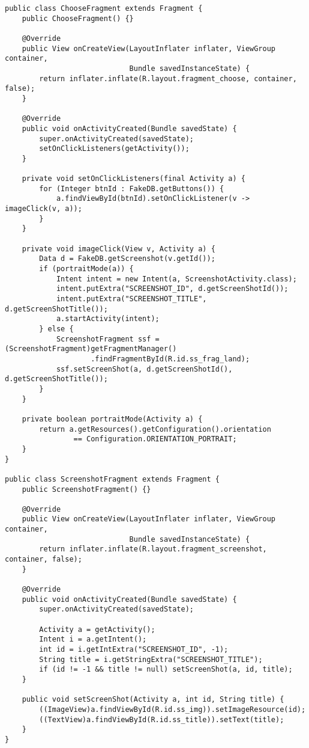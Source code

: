 \begin{lstlisting}[style=A_Java, caption={Java for fragment example}, label={listing:javaxml}]
public class ChooseFragment extends Fragment {
    public ChooseFragment() {}

    @Override
    public View onCreateView(LayoutInflater inflater, ViewGroup container,
                             Bundle savedInstanceState) {
        return inflater.inflate(R.layout.fragment_choose, container, false);
    }

    @Override
    public void onActivityCreated(Bundle savedState) {
        super.onActivityCreated(savedState);
        setOnClickListeners(getActivity());
    }

    private void setOnClickListeners(final Activity a) {
        for (Integer btnId : FakeDB.getButtons()) {
            a.findViewById(btnId).setOnClickListener(v -> imageClick(v, a));
        }
    }

    private void imageClick(View v, Activity a) {
        Data d = FakeDB.getScreenshot(v.getId());
        if (portraitMode(a)) {
            Intent intent = new Intent(a, ScreenshotActivity.class);
            intent.putExtra("SCREENSHOT_ID", d.getScreenShotId());
            intent.putExtra("SCREENSHOT_TITLE", d.getScreenShotTitle());
            a.startActivity(intent);
        } else {
            ScreenshotFragment ssf = (ScreenshotFragment)getFragmentManager()
                    .findFragmentById(R.id.ss_frag_land);
            ssf.setScreenShot(a, d.getScreenShotId(), d.getScreenShotTitle());
        }
    }

    private boolean portraitMode(Activity a) {
        return a.getResources().getConfiguration().orientation
                == Configuration.ORIENTATION_PORTRAIT;
    }
}

public class ScreenshotFragment extends Fragment {
    public ScreenshotFragment() {}

    @Override
    public View onCreateView(LayoutInflater inflater, ViewGroup container,
                             Bundle savedInstanceState) {
        return inflater.inflate(R.layout.fragment_screenshot, container, false);
    }

    @Override
    public void onActivityCreated(Bundle savedState) {
        super.onActivityCreated(savedState);

        Activity a = getActivity();
        Intent i = a.getIntent();
        int id = i.getIntExtra("SCREENSHOT_ID", -1);
        String title = i.getStringExtra("SCREENSHOT_TITLE");
        if (id != -1 && title != null) setScreenShot(a, id, title);
    }

    public void setScreenShot(Activity a, int id, String title) {
        ((ImageView)a.findViewById(R.id.ss_img)).setImageResource(id);
        ((TextView)a.findViewById(R.id.ss_title)).setText(title);
    }
}
\end{lstlisting}

